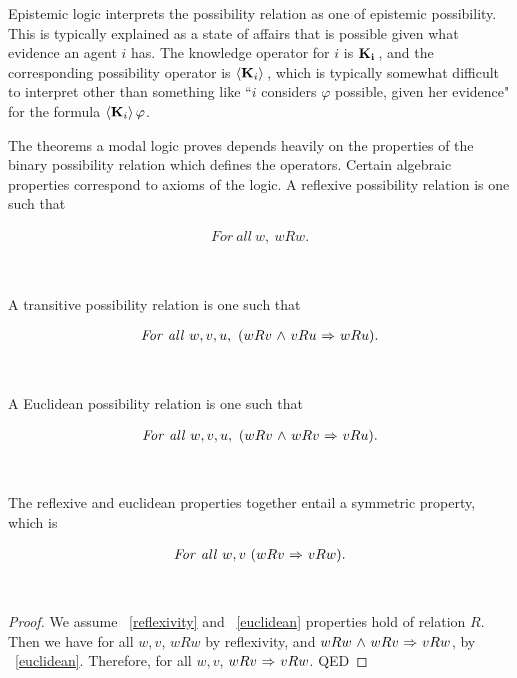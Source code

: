 Epistemic logic interprets the possibility relation as one of epistemic possibility. This is typically explained as a state of affairs that is possible given what evidence an agent $i$ has. The knowledge operator for $i$ is $\mathbf{K}_{\mathbf{i}}\,$, and the corresponding possibility operator is $\langle \mathbf{K}_{i} \rangle\,$, which is typically somewhat difficult to interpret other than something like ``$i$ considers $\varphi$ possible, given her evidence" for the formula $\langle \mathbf{K}_{i} \rangle\,\varphi$.

The theorems a modal logic proves depends heavily on the properties of the binary possibility relation which defines the operators. Certain algebraic properties correspond to axioms of the logic. A reflexive possibility relation is one such that 
\begin{definition}[Reflexivity]
	\begin{center}
		\begin{eqnarray}
		\mathit{For\ all\ }w,\ wRw.
		\end{eqnarray}
	\end{center}~\label{reflexivity}
\end{definition}
A transitive possibility relation is one such that
\begin{definition}[Transitivity]
	\begin{center}
		\begin{eqnarray}
		\mathit{For\ all\ }w,v,u,\ (wRv{\ \wedge \ } vRu {\ \Rightarrow \ } wRu).
		\end{eqnarray}
	\end{center}~\label{transitivity}
\end{definition}

A Euclidean possibility relation is one such that
\begin{definition}[Euclidean]
	\begin{center}
		\begin{eqnarray}
		\mathit{For\ all\ }w,v,u,\ (wRv{\ \wedge \ } wRv {\ \Rightarrow \ } vRu).
		\end{eqnarray}
	\end{center}~\label{euclidean}
\end{definition}

The reflexive and euclidean properties together entail a symmetric property, which is
\begin{definition}[Symmetry]
	\begin{center}
		\begin{eqnarray}
		\mathit{For\ all\ }w,v\ (wRv{\ \Rightarrow \ } vRw).
		\end{eqnarray}
	\end{center}
\end{definition}~\label{symmetry}
\begin{proof}
	We assume ~\ref{reflexivity} and ~\ref{euclidean} properties hold of relation $R$. Then we have for all $w,v$, $wRw$ by reflexivity, and $wRw {\ \wedge \ } wRv {\ \Rightarrow \ } vRw$, by ~\ref{euclidean}. Therefore, for all $w,v$, $wRv{\ \Rightarrow \ } vRw$.    QED
\end{proof}

